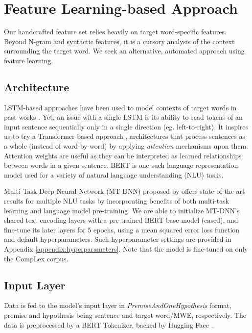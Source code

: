 \documentclass{dcthesis}
\theoremstyle{definition}
\theoremstyle{remark}
\begin{document}
\section{Feature Learning-based Approach}

Our handcrafted feature set relies heavily on target word-specific features. Beyond N-gram and syntactic features, it is a cursory analysis of the context surrounding the target word. We seek an alternative, automated approach using feature learning.

\subsection{Architecture}

LSTM-based approaches have been used to model contexts of target words in past works \citep{hartmann2018nilc, de2018deep}. Yet, an issue with a single LSTM is its ability to read tokens of an input sentence sequentially only in a single direction (eg. left-to-right). It inspires us to try a Transformer-based approach \citep{vaswani2017attention}, architectures that process sentences as a whole (instead of word-by-word) by applying \textit{attention} mechanisms upon them. Attention weights are useful as they can be interpreted as learned relationships between words in a given sentence. BERT \citep{devlin2018bert} is one such language representation model used for a variety of natural language understanding (NLU) tasks.

Multi-Task Deep Neural Network (MT-DNN) proposed by \citet{liu2019multi} offers state-of-the-art results for multiple NLU tasks by incorporating benefits of both multi-task learning and language model pre-training. We are able to initialize MT-DNN's shared text encoding layers with a pre-trained BERT base model (cased), and fine-tune its later layers for 5 epochs, using a mean squared error loss function and default hyperparameters. Such hyperparameter settings are provided in Appendix \ref{appendix:hyperparameters}. Note that the model is fine-tuned on only the CompLex corpus.

\subsection{Input Layer}

Data is fed to the model's input layer in \textit{PremiseAndOneHypothesis} format, premise and hypothesis being sentence and target word/MWE, respectively. The data is preprocessed by a BERT Tokenizer, backed by Hugging Face \citep{wolf2020transformers}.
\end{document}
